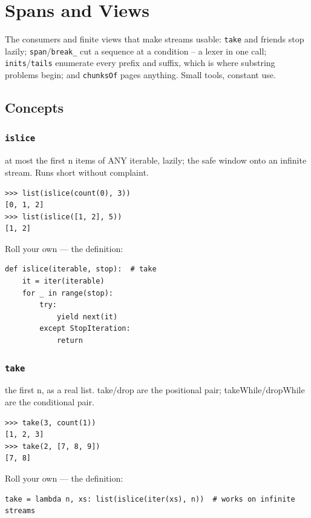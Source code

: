 \documentclass[10pt,letterpaper]{book}
\begin{document}
\clearpage
\chapter{Spans and Views}

The consumers and finite views that make streams usable: \texttt{take} and
friends stop lazily; \texttt{span}/\texttt{break\_} cut a sequence at a
condition -- a lexer in one call; \texttt{inits}/\texttt{tails} enumerate
every prefix and suffix, which is where substring problems begin; and
\texttt{chunksOf} pages anything. Small tools, constant use.
\section{Concepts}
\subsection{\texttt{islice}}\label{def:islice}
at most the first n items of ANY iterable, lazily; the safe window onto an infinite stream. Runs short without complaint.
\begin{lstlisting}[style=ex]
>>> list(islice(count(0), 3))
[0, 1, 2]
>>> list(islice([1, 2], 5))
[1, 2]
\end{lstlisting}

Roll your own --- the definition:

\begin{lstlisting}[style=ex]
def islice(iterable, stop):  # take
    it = iter(iterable)
    for _ in range(stop):
        try:
            yield next(it)
        except StopIteration:
            return
\end{lstlisting}

\subsection{\texttt{take}}\label{def:take}
the first n, as a real list. take/drop are the positional pair; takeWhile/dropWhile are the conditional pair.
\begin{lstlisting}[style=ex]
>>> take(3, count(1))
[1, 2, 3]
>>> take(2, [7, 8, 9])
[7, 8]
\end{lstlisting}

Roll your own --- the definition:

\begin{lstlisting}[style=ex]
take = lambda n, xs: list(islice(iter(xs), n))  # works on infinite streams
\end{lstlisting}
\end{document}
